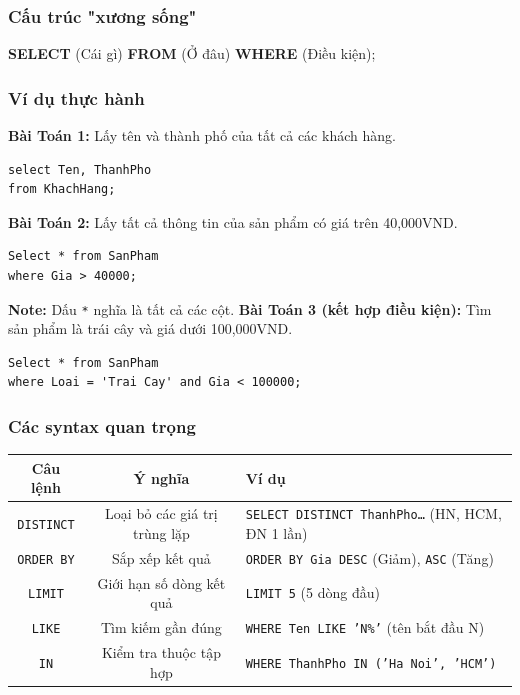\documentclass[12pt,a4paper]{article}
\renewcommand{\arraystretch}{1.5} %
\begin{document}
\subsubsection{Cấu trúc \textbf{"xương sống"}}
\begin{center}
    \textbf{SELECT} (Cái gì) \textbf{FROM} (Ở đâu) \textbf{WHERE} (Điều kiện);
\end{center}
\subsubsection{Ví dụ thực hành}
\textbf{Bài Toán 1: } Lấy tên và thành phố của tất cả các khách hàng.
\begin{lstlisting}[style=sqlstyle]
select Ten, ThanhPho
from KhachHang;
\end{lstlisting}
\textbf{Bài Toán 2: } Lấy tất cả thông tin của sản phẩm có giá trên 40,000VND.
\begin{lstlisting}[style=sqlstyle]
Select * from SanPham
where Gia > 40000;
\end{lstlisting}
\textbf{Note: } Dấu \texttt{*} nghĩa là tất cả các cột.
\textbf{Bài Toán 3 (kết hợp điều kiện): } Tìm sản phẩm là trái cây và giá dưới 100,000VND.
\begin{lstlisting}
Select * from SanPham
where Loai = 'Trai Cay' and Gia < 100000;
\end{lstlisting}
\subsubsection{Các syntax quan trọng}
\begin{table}[H]
\renewcommand{\arraystretch}{1.3}
\begin{tabular}{|c|c|>{\small}p{4cm}|}\hline
\textbf{Câu lệnh} & \textbf{Ý nghĩa} & \textbf{Ví dụ} \\ \hline
\texttt{DISTINCT} & Loại bỏ các giá trị trùng lặp & \texttt{SELECT DISTINCT ThanhPho\dots} (HN, HCM, ĐN 1 lần)\\ \hline
\texttt{ORDER BY} & Sắp xếp kết quả & \texttt{ORDER BY Gia DESC} (Giảm), \texttt{ASC} (Tăng)\\ \hline
\texttt{LIMIT} & Giới hạn số dòng kết quả & \texttt{LIMIT 5} (5 dòng đầu)\\ \hline
\texttt{LIKE} & Tìm kiếm gần đúng & \texttt{WHERE Ten LIKE 'N\%'} (tên bắt đầu N)\\ \hline
\texttt{IN} & Kiểm tra thuộc tập hợp & \texttt{WHERE ThanhPho IN ('Ha Noi', 'HCM')}\\ \hline
\end{tabular}
\end{table}
\end{document}
